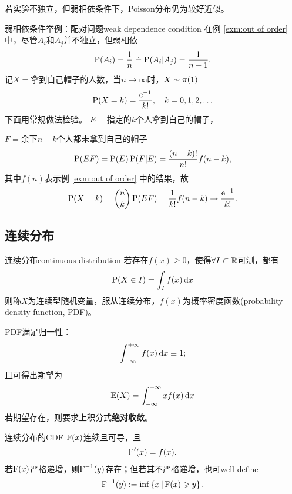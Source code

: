若实验不独立，但弱相依条件下，Poisson分布仍为较好近似。
\begin{example}{弱相依条件举例：配对问题}{weak dependence condition}
	在例 \ref{exm:out of order} 中，尽管$A_i$和$A_j$并不独立，但弱相依
	\[
		\P(A_i)=\frac1n\doteq\P(A_i|A_j)=\frac1{n-1}.
	\]
	记$X=$拿到自己帽子的人数，当$n\to\infty$时，$X\sim\Pois(1)$
	\[
		\P(X=k)=\frac{\e{-1}}{k!},\quad k=0,1,2,\ldots
	\]
	下面用常规做法检验。
	\tcblower
	$E=$指定的$k$个人拿到自己的帽子，
	
	$F=$余下$n-k$个人都未拿到自己的帽子
	\[
		\P(EF)=\P(E)\P(F|E)=\frac{(n-k)!}{n!}f(n-k),
	\]
	其中$f(n)$表示例 \ref{exm:out of order} 中的结果，故
	\[
		\P(X=k)={n\choose k}\P(EF)=\frac1{k!}f(n-k)\to\frac{\e{-1}}{k!}.
	\]
\end{example}
\subsection{连续分布}
\begin{definition}{连续分布}{continuous distribution}
	若存在$f(x)\geqslant 0$，使得$\forall I\subset\RR$可测，都有
	\[
		\P(X\in I)=\int_If(x)\d x
	\]
	则称$X$为连续型随机变量，服从连续分布，$f(x)$为概率密度函数(probability density function, PDF)。
\end{definition}
PDF满足归一性：
\begin{align}
	\int\iti f(x)\d x\equiv 1;
\end{align}
且可得出期望为
\begin{align}
	\E(X)=\int\iti xf(x)\d x%
\end{align}
若期望存在，则要求上积分式\textbf{绝对收敛}。

连续分布的CDF $\CDF(x)$连续且可导，且
\begin{align}
	\CDF'(x)=f(x).
\end{align}
若$\CDF(x)$严格递增，则$\CDF^{-1}(y)$存在；但若其不严格递增，也可well define
\begin{align}
	\CDF^{-1}(y):=\inf\set x{\CDF(x)\geqslant y}.
\end{align}
\iffalse
\begin{example}{常见连续分布}{}
	\begin{compactenum}
		\item 均匀分布$f(x;a,b)=\frac1{b-a},a\leqslant x\leqslant b;$
		\item 指数分布$f(x;\lambda)=\lambda\e{-\lambda x},x\geqslant 0;$
		\item 正态分布$f(x;\mu,\sigma^2)=\frac1{\sqrt{2\pi}\sigma}\e{-(x-\mu)^2/2\sigma^2},-\infty<x<\infty;$
		\item 伽玛分布$f(x;\alpha,\lambda)=\frac{\lambda^\alpha}{\Gamma(\alpha)}x^{\alpha-1}\e{-\lambda x}.x\geqslant 0;$
		\item 卡方分布$f(x;n)=\frac{x^{n/2-1}}{2^{n/2}\Gamma(n/2)}\e{-x/2},x\geqslant 0;$
	\end{compactenum}
\end{example}
\fi
